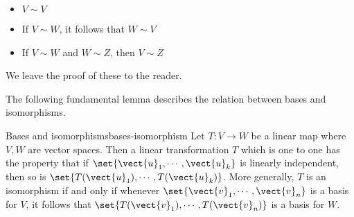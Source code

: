 \begin{itemize}
\item $V\sim V$

\item If $V\sim W$, it follows that $W\sim V$

\item If $V\sim W$ and $W\sim Z$, then $V\sim Z$
\end{itemize}

We leave the proof of these to the reader. 

The following fundamental lemma describes the relation between bases and
isomorphisms.

\begin{lemma}{Bases and isomorphisms}{bases-isomorphism}
Let $T:V\rightarrow W$ be a
 linear map where $V,W$ are vector spaces.  Then a linear transformation $T$ which is one to one has the property that
if $\set{\vect{u}_{1},\cdots ,\vect{u}_{k}} $ is linearly
independent, then so is $\set{T(\vect{u}_{1}),\cdots ,T(\vect{u}_{k})} $.
 More generally, $T$ is an
isomorphism if and only if whenever $\set{
\vect{v}_{1},\cdots ,\vect{v}_{n}} $ is a basis for $V$, it follows
that $\set{T(\vect{v}_{1}),\cdots ,T(\vect{v}_{n})} $ is a basis for $W$.
\end{lemma}

